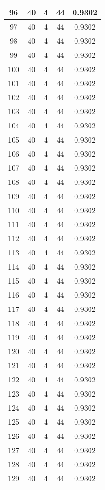 \documentclass[letterpaper, 12pt]{article}
\begin{document}
\begin{longtable}{|c|c|c|c|c|}
\hline
96 & 40 & 4 & 44 & 0.9302 \\
\hline
97 & 40 & 4 & 44 & 0.9302 \\
\hline
98 & 40 & 4 & 44 & 0.9302 \\
\hline
99 & 40 & 4 & 44 & 0.9302 \\
\hline
100 & 40 & 4 & 44 & 0.9302 \\
\hline
101 & 40 & 4 & 44 & 0.9302 \\
\hline
102 & 40 & 4 & 44 & 0.9302 \\
\hline
103 & 40 & 4 & 44 & 0.9302 \\
\hline
104 & 40 & 4 & 44 & 0.9302 \\
\hline
105 & 40 & 4 & 44 & 0.9302 \\
\hline
106 & 40 & 4 & 44 & 0.9302 \\
\hline
107 & 40 & 4 & 44 & 0.9302 \\
\hline
108 & 40 & 4 & 44 & 0.9302 \\
\hline
109 & 40 & 4 & 44 & 0.9302 \\
\hline
110 & 40 & 4 & 44 & 0.9302 \\
\hline
111 & 40 & 4 & 44 & 0.9302 \\
\hline
112 & 40 & 4 & 44 & 0.9302 \\
\hline
113 & 40 & 4 & 44 & 0.9302 \\
\hline
114 & 40 & 4 & 44 & 0.9302 \\
\hline
115 & 40 & 4 & 44 & 0.9302 \\
\hline
116 & 40 & 4 & 44 & 0.9302 \\
\hline
117 & 40 & 4 & 44 & 0.9302 \\
\hline
118 & 40 & 4 & 44 & 0.9302 \\
\hline
119 & 40 & 4 & 44 & 0.9302 \\
\hline
120 & 40 & 4 & 44 & 0.9302 \\
\hline
121 & 40 & 4 & 44 & 0.9302 \\
\hline
122 & 40 & 4 & 44 & 0.9302 \\
\hline
123 & 40 & 4 & 44 & 0.9302 \\
\hline
124 & 40 & 4 & 44 & 0.9302 \\
\hline
125 & 40 & 4 & 44 & 0.9302 \\
\hline
126 & 40 & 4 & 44 & 0.9302 \\
\hline
127 & 40 & 4 & 44 & 0.9302 \\
\hline
128 & 40 & 4 & 44 & 0.9302 \\
\hline
129 & 40 & 4 & 44 & 0.9302 \\

\end{longtable}
\end{document}
